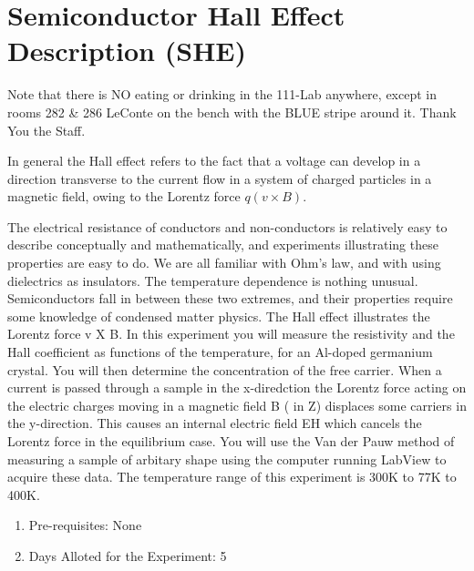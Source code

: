 \documentclass{../lab}
\begin{document}
\maketitle

\tableofcontents

\section{Semiconductor Hall Effect Description (SHE)}

Note that there is NO eating or drinking in the 111-Lab anywhere, except in rooms 282 & 286 LeConte on the bench with the BLUE stripe around it. Thank You the Staff.

In general the Hall effect refers to the fact that a voltage can develop in a direction transverse to the current flow in a system of charged particles in a magnetic field, owing to the Lorentz force $q(v \times B)$.

The electrical resistance of conductors and non-conductors is relatively easy to describe conceptually and mathematically, and experiments illustrating these properties are easy to do. We are all familiar with Ohm's law, and with using dielectrics as insulators. The temperature dependence is nothing unusual. Semiconductors fall in between these two extremes, and their properties require some knowledge of condensed matter physics. The Hall effect illustrates the Lorentz force v X B. In this experiment you will measure the resistivity and the Hall coefficient as functions of the temperature, for an Al-doped germanium crystal. You will then determine the concentration of the free carrier. When a current is passed through a sample in the x-diredction the Lorentz force acting on the electric charges moving in a magnetic field B ( in Z) displaces some carriers in the y-direction. This causes an internal electric field EH which cancels the Lorentz force in the equilibrium case. You will use the Van der Pauw method of measuring a sample of arbitary shape using the computer running LabView to acquire these data. The temperature range of this experiment is 300K to 77K to 400K.

\begin{enumerate}
    \item Pre-requisites: None
    \item Days Alloted for the Experiment: 5
\end{enumerate}
\end{document}
